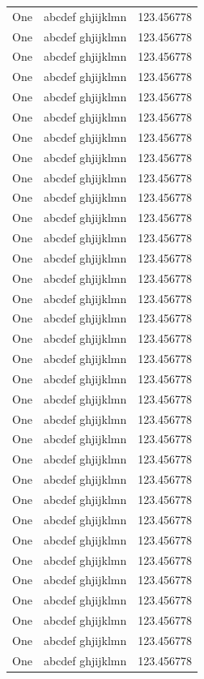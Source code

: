 \begin{center}
\begin{supertabular}[c]{|l|l|l|}
One & abcdef ghjijklmn & 123.456778 \\
One & abcdef ghjijklmn & 123.456778 \\
One & abcdef ghjijklmn & 123.456778 \\
One & abcdef ghjijklmn & 123.456778 \\
One & abcdef ghjijklmn & 123.456778 \\
One & abcdef ghjijklmn & 123.456778 \\
One & abcdef ghjijklmn & 123.456778 \\
One & abcdef ghjijklmn & 123.456778 \\
One & abcdef ghjijklmn & 123.456778 \\
One & abcdef ghjijklmn & 123.456778 \\
One & abcdef ghjijklmn & 123.456778 \\
One & abcdef ghjijklmn & 123.456778 \\
One & abcdef ghjijklmn & 123.456778 \\
One & abcdef ghjijklmn & 123.456778 \\
One & abcdef ghjijklmn & 123.456778 \\
One & abcdef ghjijklmn & 123.456778 \\
One & abcdef ghjijklmn & 123.456778 \\
One & abcdef ghjijklmn & 123.456778 \\
One & abcdef ghjijklmn & 123.456778 \\
One & abcdef ghjijklmn & 123.456778 \\
One & abcdef ghjijklmn & 123.456778 \\
One & abcdef ghjijklmn & 123.456778 \\
One & abcdef ghjijklmn & 123.456778 \\
One & abcdef ghjijklmn & 123.456778 \\
One & abcdef ghjijklmn & 123.456778 \\
One & abcdef ghjijklmn & 123.456778 \\
One & abcdef ghjijklmn & 123.456778 \\
One & abcdef ghjijklmn & 123.456778 \\
One & abcdef ghjijklmn & 123.456778 \\
One & abcdef ghjijklmn & 123.456778 \\
One & abcdef ghjijklmn & 123.456778 \\
One & abcdef ghjijklmn & 123.456778 \\
One & abcdef ghjijklmn & 123.456778 \\

\end{supertabular}
\end{center}
